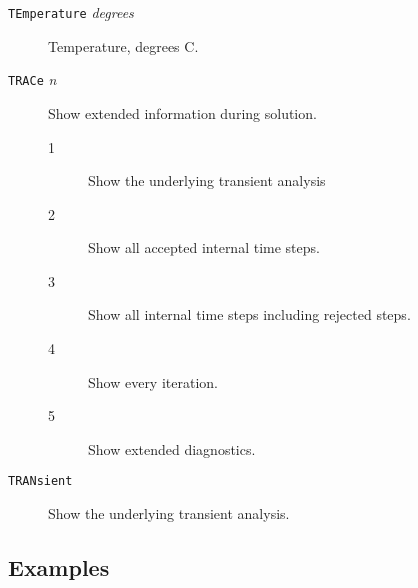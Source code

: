 \begin{description}
\item[{\tt TEmperature} {\it degrees}] Temperature,
degrees C.

\item[{\tt TRACe} {\it n}] Show extended information during solution.
\begin{description}
\item[1] Show the underlying transient analysis
\item[2] Show all accepted internal time steps.
\item[3] Show all internal time steps including rejected steps.
\item[4] Show every iteration.
\item[5] Show extended diagnostics.
\end{description}

\item[{\tt TRANsient}] Show the underlying transient analysis.

\end{description}
\subsection{Examples}

